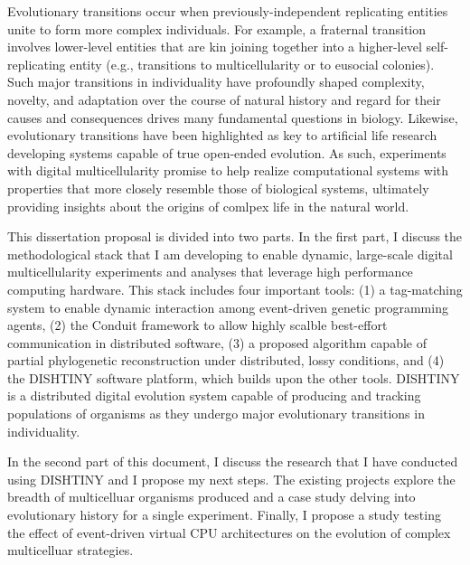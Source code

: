 Evolutionary transitions occur when previously-independent replicating entities unite to form more complex individuals.
For example, a fraternal transition involves lower-level entities that are kin joining together into a higher-level self-replicating entity (e.g., transitions to multicellularity or to eusocial colonies).
Such major transitions in individuality have profoundly shaped complexity, novelty, and adaptation over the course of natural history and regard for their causes and consequences drives many fundamental questions in biology.
Likewise, evolutionary transitions have been highlighted as key to artificial life research developing systems capable of true open-ended evolution.
As such, experiments with digital multicellularity promise to help realize computational systems with properties that more closely resemble those of biological systems, ultimately providing insights about the origins of comlpex life in the natural world.

This dissertation proposal is divided into two parts. 
In the first part, I discuss the methodological stack that I am developing to enable dynamic, large-scale digital multicellularity experiments and analyses that leverage high performance computing hardware.
This stack includes four important tools:
(1) a tag-matching system to enable dynamic interaction among event-driven genetic programming agents,
(2) the Conduit framework to allow highly scalble best-effort communication in distributed software, 
(3) a proposed algorithm capable of partial phylogenetic reconstruction under distributed, lossy conditions, and
(4) the DISHTINY software platform, which builds upon the other tools. 
DISHTINY is a distributed digital evolution system capable of producing and tracking populations of organisms as they undergo major evolutionary transitions in individuality.

In the second part of this document, I discuss the research that I have conducted using DISHTINY and I propose my next steps.
The existing projects explore the breadth of multicelluar organisms produced and a case study delving into evolutionary history for a single experiment. 
Finally, I propose a study testing the effect of event-driven virtual CPU architectures on the evolution of complex multicelluar strategies.
